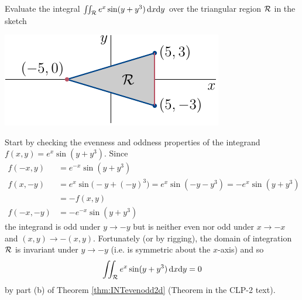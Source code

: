 \begin{eg}\label{eg_odd_integralA}
Evaluate the integral $\iint_{\mathcal{R}} e^x\sin(y+y^3)\,\mathrm{d}x\mathrm{d}y$ over 
the triangular region $\mathcal{R}$ in the sketch
\begin{efig}
\begin{center}
   \includegraphics{reflDxSym.pdf}
\end{center}
\end{efig}

\soln
Start by checking the evenness and oddness properties of the integrand
$f(x,y) =  e^x\sin(y+y^3)$.
Since
\begin{align*}
f(-x,y)&=e^{-x}\sin(y+y^3) \\
f(x,-y)&=e^{x}\sin\big(-y+(-y)^3\big)
        =e^{x}\sin(-y-y^3)
        =-e^{x}\sin(y+y^3) \\
        &=-f(x,y) \\
f(-x,-y)&=-e^{-x}\sin(y+y^3) 
\end{align*}
the integrand is odd under $y\rightarrow-y$ but is neither even nor odd
under $x\rightarrow -x$ and $(x,y)\rightarrow-(x,y)$. Fortunately (or by rigging), the domain of integration $\mathcal{R}$ is invariant under $y\rightarrow -y$ (i.e. is symmetric about the $x$-axis) and so
\begin{equation*}
\iint_{\mathcal{R}} e^x\sin(y+y^3)\,\mathrm{d}x\mathrm{d}y=0
\end{equation*}
by part (b) of Theorem \ref{thm:INTevenodd2d} (Theorem  in the CLP-2 text).
\end{eg}

